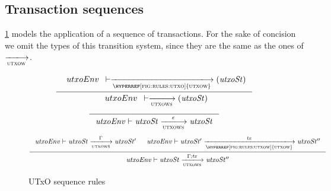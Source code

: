 \subsection{Transaction sequences}
\label{sec:transaction-seqs}

\cref{fig:rules:utxow-seq} models the application of a sequence of
transactions. For the sake of concision we omit the types of this transition
system, since they are the same as the ones of $\trans{utxow}{}$.

\begin{figure}[htb]
  \begin{equation}\label{eq:utxows-bootstrap}
    \inference
    {
      {\begin{array}{l}
         utxoEnv
      \end{array}}
      \vdash
      \trans{\hyperref[fig:rules:utxo]{utxow}}{}
      \left(
        \var{utxoSt}
      \right)
    }
    {
      {\begin{array}{l}
         utxoEnv
      \end{array}}
      \vdash
      \trans{utxows}{}
      \left(
        \var{utxoSt}
      \right)
    }
  \end{equation}
  \nextdef
  \begin{equation}
    \label{eq:rule:utxow-seq-base}
    \inference
    {}
    {\var{utxoEnv} \vdash \var{utxoSt} \trans{utxows}{\epsilon} \var{utxoSt}}
  \end{equation}
  \nextdef
  \begin{equation}
    \label{eq:rule:utxow-seq-ind}
    \inference
    {
      \var{utxoEnv} \vdash \var{utxoSt} \trans{utxows}{\Gamma} \var{utxoSt'}
      &
      \var{utxoEnv} \vdash \var{utxoSt'} \trans{\hyperref[fig:rules:utxow]{utxow}}{\var{tx}} \var{utxoSt''}
    }
    {\var{utxoEnv} \vdash \var{utxoSt} \trans{utxows}{\Gamma;\var{tx}} \var{utxoSt''}}
  \end{equation}
  \caption{UTxO sequence rules}
  \label{fig:rules:utxow-seq}
\end{figure}
